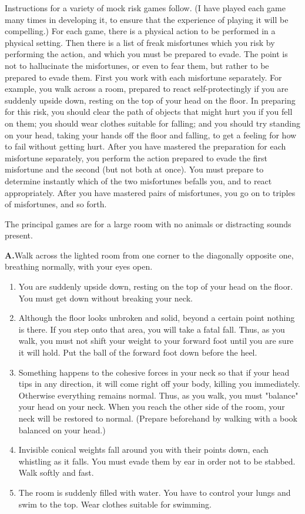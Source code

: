 Instructions for a variety of mock risk games follow. (I have played 
each game many times in developing it, to ensure that the experience of 
playing it will be compelling.) For each game, there is a physical action to be 
performed in a physical setting. Then there is a list of freak misfortunes 
which you risk by performing the action, and which you must be prepared 
to evade. The point is not to hallucinate the misfortunes, or even to fear 
them, but rather to be prepared to evade them. First you work with each 
misfortune separately. For example, you walk across a room, prepared to 
react self-protectingly if you are suddenly upside down, resting on the top of 
your head on the floor. In preparing for this risk, you should clear the path 
of objects that might hurt you if you fell on them; you should wear clothes 
suitable for falling; and you should try standing on your head, taking your 
hands off the floor and falling, to get a feeling for how to fail without 
getting hurt. After you have mastered the preparation for each misfortune 
separately, you perform the action prepared to evade the first misfortune 
and the second (but not both at once). You must prepare to determine 
instantly which of the two misfortunes befalls you, and to react 
appropriately. After you have mastered pairs of misfortunes, you go on to 
triples of misfortunes, and so forth. 

The principal games are for a large room with no animals or distracting 
sounds present. 

\textbf{A.}Walk across the lighted room from one corner to the diagonally 
opposite one, breathing normally, with your eyes open. 
\begin{enumerate}
\item You are suddenly upside down, resting on the top of your head on the 
floor. You must get down without breaking your neck. 

\item Although the floor looks unbroken and solid, beyond a certain point 
nothing is there. If you step onto that area, you will take a fatal fall. Thus, as 
you walk, you must not shift your weight to your forward foot until you are 
sure it will hold. Put the ball of the forward foot down before the heel. 

\item Something happens to the cohesive forces in your neck so that if your 
head tips in any direction, it will come right off your body, killing you 
immediately. Otherwise everything remains normal. Thus, as you walk, you 
must "balance" your head on your neck. When you reach the other side of 
the room, your neck will be restored to normal. (Prepare beforehand by 
walking with a book balanced on your head.) 

\item Invisible conical weights fall around you with their points down, each 
whistling as it falls. You must evade them by ear in order not to be stabbed. 
Walk softly and fast. 

\item The room is suddenly filled with water. You have to control your lungs 
and swim to the top. Wear clothes suitable for swimming. 
\end{enumerate}

